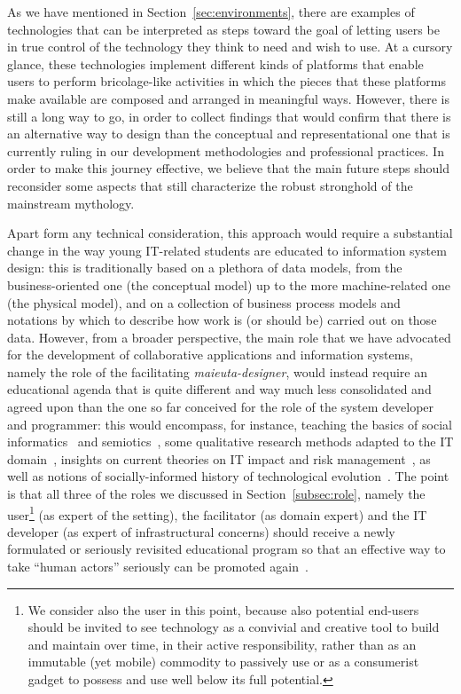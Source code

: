 \documentclass{article}
\begin{document}
As we have mentioned in Section~\ref{sec:environments}, there are examples of technologies that can be interpreted as steps toward the goal of letting users be in true control of the technology they think to need and wish to use. At a cursory glance, these technologies implement different kinds of platforms that enable users to perform bricolage-like activities in which the pieces that these platforms make available are composed and arranged in meaningful ways. However, there is still a long way to go, in order to collect findings that would confirm that there is an alternative way to design than the conceptual and representational one that is currently ruling in our development methodologies and professional practices. In order to make this journey effective, we believe that the main future steps should reconsider some aspects that still characterize the robust stronghold of the mainstream mythology. 


Apart form any technical consideration, this approach would require a substantial change in the way young IT-related students are educated to information system design: this is traditionally based on a plethora of data models, from the business-oriented one (the conceptual model) up to the more machine-related one (the physical model), and on a collection of business process models and notations by which to describe how work is (or should be) carried out on those data. However, from a broader perspective, the main role that we have advocated for the development of collaborative applications and information systems, namely the role of the facilitating \emph{maieuta-designer}, would instead require an educational agenda that is quite different and way much less consolidated and agreed upon than the one so far conceived for the role of the system developer and programmer: this would encompass, for instance, teaching the basics of social informatics~\citep{kling_understanding_2005} and semiotics~\citep{de_souza_semiotic_2009}, some qualitative research methods adapted to the IT domain~\citep{kling_understanding_2005}, insights on current theories on IT impact and risk management~\citep{hanseth_risk_2007}, as well as notions of socially-informed history of technological evolution~\citep{akera_using_2004}. The point is that all three of the roles we discussed in Section~\ref{subsec:role}, namely the user\footnote{We consider also the user in this point, because also potential end-users should be invited to see technology as a convivial and creative tool to build and maintain over time, in their active responsibility, rather than as an immutable (yet mobile) commodity to passively use or as a consumerist gadget to possess and use well below its full potential.} (as expert of the setting), the facilitator (as domain expert) and the IT developer (as expert of infrastructural concerns) should receive a newly formulated or seriously revisited educational program so that an effective way to take ``human actors'' seriously can be promoted again~\citep{bannon_human_1992}. 
\end{document}
